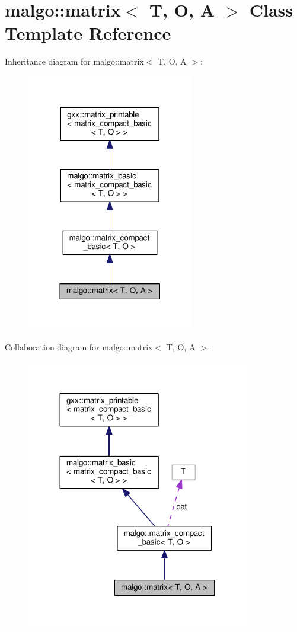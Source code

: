 \hypertarget{classmalgo_1_1matrix}{}\section{malgo\+:\+:matrix$<$ T, O, A $>$ Class Template Reference}
\label{classmalgo_1_1matrix}


Inheritance diagram for malgo\+:\+:matrix$<$ T, O, A $>$\+:
\nopagebreak
\begin{figure}[H]
\begin{center}
\leavevmode
\includegraphics[width=206pt]{classmalgo_1_1matrix__inherit__graph}
\end{center}
\end{figure}


Collaboration diagram for malgo\+:\+:matrix$<$ T, O, A $>$\+:
\nopagebreak
\begin{figure}[H]
\begin{center}
\leavevmode
\includegraphics[width=275pt]{classmalgo_1_1matrix__coll__graph}
\end{center}
\end{figure}
